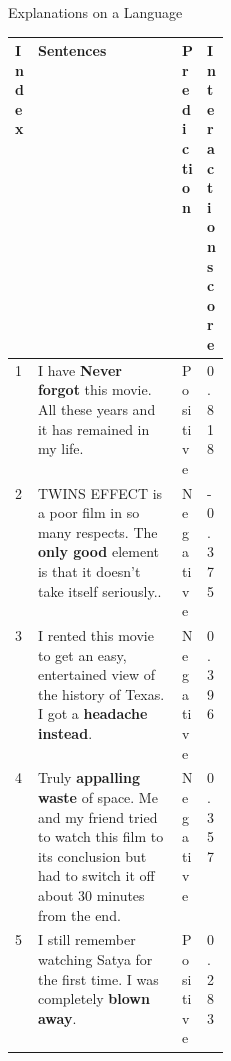 \documentclass[10pt]{beamer}
\begin{document}
\begin{frame}{Explanations on a Language}


\begin{table}[h!]
\scriptsize %
\keepXColumns %
\begin{tabularx}{\linewidth}{m{0.05\linewidth}|X|m{0.1\linewidth}|m{0.1\linewidth}} 
\toprule
Index & Sentences & Prediction & Interaction score \\
\midrule
1 & I have \textbf{Never forgot} this movie. All these years and it has remained in my life. & Positive & 0.818 \\
\midrule
2 & TWINS EFFECT is a poor film in so many respects. The \textbf{only good} element is that it doesn't take itself seriously.. & Negative & -0.375 \\
\midrule
3 & I rented this movie to get an easy, entertained view of the history of Texas. I got a \textbf{headache instead}. & Negative & 0.396 \\
\midrule
4 & Truly \textbf{appalling waste} of space. Me and my friend tried to watch this film to its conclusion but had to switch it off about 30 minutes from the end. & Negative & 0.357 \\
\midrule
5 & I still remember watching Satya for the first time. I was completely \textbf{blown away}. & Positive & 0.283 \\
\bottomrule
\end{tabularx}
\end{table}


\end{frame}






\end{document}
